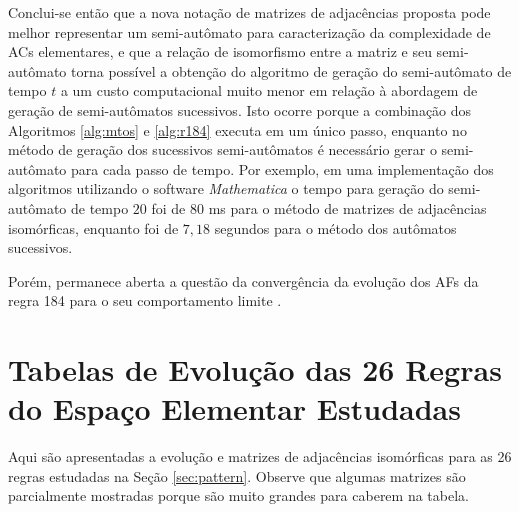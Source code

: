 \documentclass[12pt,a4paper]{article}
\begin{document}
Conclui-se então que a nova notação de matrizes de adjacências proposta
pode melhor representar um semi-autômato para caracterização da complexidade
de ACs elementares, e que a relação de isomorfismo entre
a matriz e seu semi-autômato torna possível a obtenção do algoritmo de
geração do semi-autômato de tempo $t$ a um custo computacional muito
menor em relação à abordagem de geração de semi-autômatos sucessivos.
Isto ocorre porque a combinação dos Algoritmos \ref{alg:mtos} e
\ref{alg:r184} executa em um único passo, enquanto no método de
geração dos sucessivos semi-autômatos é necessário gerar o
semi-autômato para cada passo de tempo. Por exemplo, em uma implementação dos
algoritmos utilizando o software \textit{Mathematica} o tempo para geração
do semi-autômato de tempo $20$ foi de $80$ ms para o método de matrizes
de adjacências isomórficas, enquanto foi de $7,18$ segundos para o método
dos autômatos sucessivos.

Porém, permanece aberta a questão da convergência da evolução dos AFs da
regra 184 para o seu comportamento limite .

\newpage

\appendix
\section{Tabelas de Evolução das 26 Regras do Espaço Elementar Estudadas}\label{sec:matrices}

Aqui são apresentadas a evolução e matrizes de adjacências isomórficas
para as 26 regras estudadas na Seção \ref{sec:pattern}. Observe que
algumas matrizes são parcialmente mostradas porque são muito grandes para
caberem na tabela.

\newpage
\end{document}
